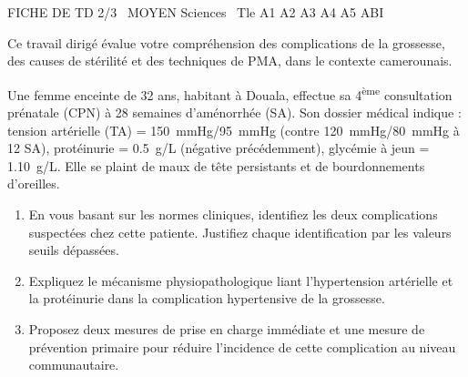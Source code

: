 \documentclass[11pt]{article}
\begin{document}
\begin{tcolorbox}[enhanced,colback=popink,colframe=popink,arc=10pt,boxrule=0pt,left=12pt,right=12pt,top=9pt,bottom=9pt]
{\color{white}\popxbold\small FICHE DE TD 2/3 \textbullet\ MOYEN \hfill Sciences \textbullet\ Tle A1 A2 A3 A4 A5 ABI\par}
\end{tcolorbox}
\vspace{4pt}
\noindent Ce travail dirigé évalue votre compréhension des complications de la grossesse, des causes de stérilité et des techniques de PMA, dans le contexte camerounais.

\begin{exercice}
Une femme enceinte de 32 ans, habitant à Douala, effectue sa 4\textsuperscript{ème} consultation prénatale (CPN) à 28 semaines d'aménorrhée (SA). Son dossier médical indique : tension artérielle (TA) = \SI{150}{mmHg}/\SI{95}{mmHg} (contre \SI{120}{mmHg}/\SI{80}{mmHg} à 12 SA), protéinurie = \SI{0,5}{g/L} (négative précédemment), glycémie à jeun = \SI{1,10}{g/L}. Elle se plaint de maux de tête persistants et de bourdonnements d'oreilles.
\begin{enumerate}
    \item En vous basant sur les normes cliniques, identifiez les deux complications suspectées chez cette patiente. Justifiez chaque identification par les valeurs seuils dépassées.
    \item Expliquez le mécanisme physiopathologique liant l'hypertension artérielle et la protéinurie dans la complication hypertensive de la grossesse.
    \item Proposez deux mesures de prise en charge immédiate et une mesure de prévention primaire pour réduire l'incidence de cette complication au niveau communautaire.
\end{enumerate}
\end{exercice}
\end{document}
